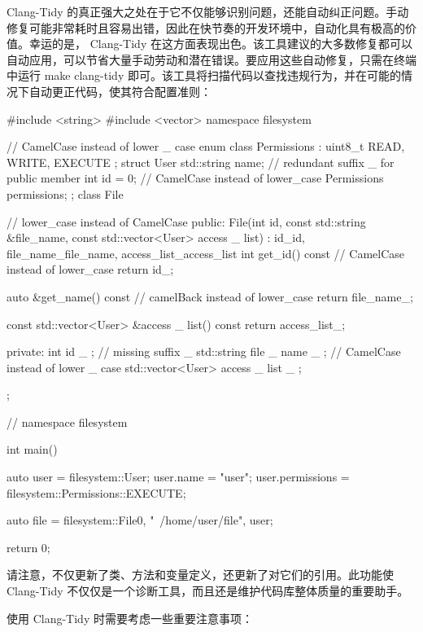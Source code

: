 
Clang-Tidy 的真正强大之处在于它不仅能够识别问题，还能自动纠正问题。手动修复可能非常耗时且容易出错，因此在快节奏的开发环境中，自动化具有极高的价值。幸运的是， Clang-Tidy 在这方面表现出色。该工具建议的大多数修复都可以自动应用，可以节省大量手动劳动和潜在错误。要应用这些自动修复，只需在终端中运行 make clang-tidy 即可。该工具将扫描代码以查找违规行为，并在可能的情况下自动更正代码，使其符合配置准则：

\begin{cpp}
#include <string>
#include <vector>
namespace filesystem { // CamelCase instead of lower _ case
enum class Permissions : uint8_t { READ, WRITE, EXECUTE };
struct User {
    std::string name; // redundant suffix _ for public member
    int id = 0; // CamelCase instead of lower_case
    Permissions permissions;
};
class File { // lower_case instead of CamelCase
    public:
    File(int id, const std::string &file_name,
        const std::vector<User> access _ list)
        : id_{id}, file_name_{file_name}, access_list_{access_list} {}
    int get_id() const // CamelCase instead of lower_case
    {
        return id_;
    }

    auto &get_name() const // camelBack instead of lower_case
    {
        return file_name_;
    }

    const std::vector<User> &access _ list() const { return access_list_; }

private:
    int id _ ; // missing suffix _
    std::string file _ name _ ; // CamelCase instead of lower _ case
    std::vector<User> access _ list _ ;
};
} // namespace filesystem

int main() {
    auto user = filesystem::User{};
    user.name = "user";
    user.permissions = filesystem::Permissions::EXECUTE;

    auto file = filesystem::File{0, "~/home/user/file", {user}};

    return 0;
}
\end{cpp}

请注意，不仅更新了类、方法和变量定义，还更新了对它们的引用。此功能使 Clang-Tidy 不仅仅是一个诊断工具，而且还是维护代码库整体质量的重要助手。


使用 Clang-Tidy 时需要考虑一些重要注意事项：

